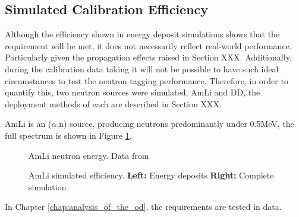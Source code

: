 \subsection{Simulated Calibration Efficiency}
\par
Although the efficiency shown in energy deposit simulations shows that the requirement will be met, it does not necessarily reflect real-world performance.
Particularly given the propagation effects raised in Section XXX.
Additionally, during the calibration data taking it will not be possible to have such ideal circumstances to test the neutron tagging performance.
Therefore, in order to quantify this, two neutron sources were simulated, AmLi and DD, the deployment methods of each are described in Section XXX.

\par
AmLi is an ($\alpha$,n) source, producing neutrons predominantly under 0.5MeV, the full spectrum is shown in Figure \ref{fig:amli_neutron_energy_spectrum}.

\begin{figure}[!htbp]
    \centering
    \caption{AmLi neutron energy. Data from \cite{amli_neutron_energy_ref} }
    \label{fig:amli_neutron_energy_spectrum}
\end{figure}


\begin{figure}[!htbp]%
\centering
{}
\caption{AmLi simulated efficiency. \textbf{Left:} Energy deposits \textbf{Right:} Complete simulation}
\label{fig:asdasdasd}
\end{figure}

\par
In Chapter \ref{chap:analysis_of_the_od}, the requirements are tested in data.